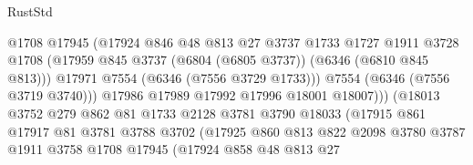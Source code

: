 \begin{lexlean}{RustStd}
\begin{coremodule}
                                    @1708
                                    @17945
                                    (@17924
                                      @846
                                      @48
                                      @813
                                      @27
                                      @3737
                                      @1733
                                      @1727
                                      @1911
                                      @3728
                                      @1708
                                      (@17959
                                        @845
                                        @3737
                                        (@6804 (@6805 @3737))
                                        (@6346 (@6810 @845 @813)))
                                      @17971
                                      @7554
                                      (@6346 (@7556 @3729 @1733)))
                                    @7554
                                    (@6346 (@7556 @3719 @3740)))
                                  @17986
                                  @17989
                                  @17992
                                  @17996
                                  @18001
                                  @18007)))
                            (@18013
                              @3752
                              @279
                              @862
                              @81
                              @1733
                              @2128
                              @3781
                              @3790
                              @18033
                              (@17915
                                @861
                                @17917
                                @81
                                @3781
                                @3788
                                @3702
                                (@17925
                                  @860
                                  @813
                                  @822
                                  @2098
                                  @3780
                                  @3787
                                  @1911
                                  @3758
                                  @1708
                                  @17945
                                  (@17924
                                    @858
                                    @48
                                    @813
                                    @27

\end{coremodule}
\end{lexlean}
